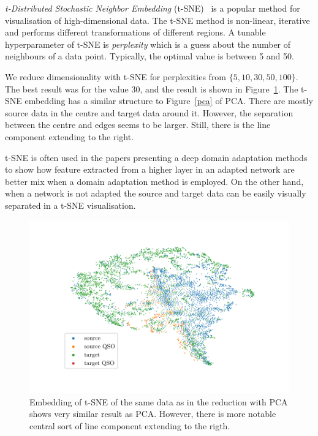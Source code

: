 \textit{t-Distributed Stochastic Neighbor Embedding} (t-SNE)~\cite{maaten2008, wattenberg2016} is a popular method for visualisation of high-dimensional data.
The t-SNE method is non-linear, iterative
and performs different transformations of different regions.
A tunable hyperparameter of t-SNE is \textit{perplexity}
which is a guess about the number of neighbours of a data point.
Typically, the optimal value is between 5 and 50.

We reduce dimensionality with t-SNE for perplexities from \(\{5, 10, 30, 50, 100\}\).
The best result was for the value 30,
and the result is shown in Figure~\ref{tsne}.
The t-SNE embedding has a similar structure to Figure~\ref{pca} of PCA.
There are mostly source data in the centre and target data around it.
However, the separation between the centre and edges seems to be larger.
Still, there is the line component extending to the right.

t-SNE is often used in the papers presenting a deep domain adaptation methods
to show how feature extracted from a higher layer in an adapted network
are better mix when a domain adaptation method is employed.
On the other hand, when a network is not adapted the source and target data
can be easily visually separated in a t-SNE visualisation.

\begin{figure}
\includegraphics[width=\textwidth]{img/tsne.pdf}
\caption[t-SNE visualisation of source and target data distributions]{
	Embedding of t-SNE of the same data
	as in the reduction with PCA shows very similar result as PCA.
	However, there is more notable central sort of line component
	extending to the rigth.
	}
\label{tsne}
\end{figure}

